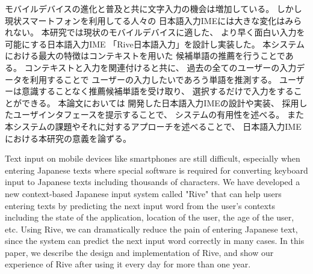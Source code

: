 


\begin{jabstract}

モバイルデバイスの進化と普及と共に文字入力の機会は増加している。
しかし現状スマートフォンを利用してる人々の
日本語入力IMEには大きな変化はみられない。
本研究では現状のモバイルデバイスに適した、
より早く面白い入力を可能にする日本語入力IME
「Rive日本語入力」を設計し実装した。
本システムにおける最大の特徴はコンテキストを用いた
候補単語の推薦を行うことである。
コンテキストと入力を関連付けると共に、
過去の全てのユーザーの入力データを利用することで
ユーザーの入力したいであろう単語を推測する。
ユーザーは意識することなく推薦候補単語を受け取り、
選択するだけで入力をすることができる。
本論文においては
開発した日本語入力IMEの設計や実装、
採用したユーザインタフェースを提示することで、
システムの有用性を述べる。
また本システムの課題やそれに対するアプローチを述べることで、
日本語入力IMEにおける本研究の意義を論ずる。

\end{jabstract}

\begin{eabstract}

Text input on mobile devices like smartphones
are still difficult, especially when entering Japanese texts where
special software is required for converting keyboard input to
Japanese texts including thousands of characters.
We have developed a new context-based Japanese input system called
"Rive" that can help users entering texts by predicting the next
input word from the user's contexts including the state of
the application, location of the user, the age of the user,
etc.
Using Rive, we can dramatically reduce the pain of entering Japanese
text, since the system can predict the next input word
correctly in many cases.
In this paper, we describe the design and implementation of Rive,
and show our experience of Rive after using it every day
for more than one year.

\end{eabstract}
